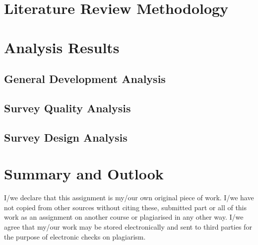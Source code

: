 \documentclass[12pt,a4paper]{article}
\begin{document}
\section{Literature Review Methodology}
\label{02_literature_review_methodology}


\section{Analysis Results}
\label{03_analysis_results}

\subsection{General Development Analysis}
\label{03_01_general_development_analysis}


\subsection{Survey Quality Analysis}
\label{03_02_survey_quality_analysis}


\subsection{Survey Design Analysis}
\label{03_04_survey_design_analysis}


\section{Summary and Outlook}
\label{04_summary_and_outlook}


\newpage
\printbibliography

\newpage

I/we declare that this assignment is my/our own original piece of work. I/we have not copied from other sources without citing these, submitted part or all of this work as an assignment on another course or plagiarised in any other way. I/we agree that my/our work may be stored electronically and sent to third parties for the purpose of electronic checks on plagiarism.
\end{document}
